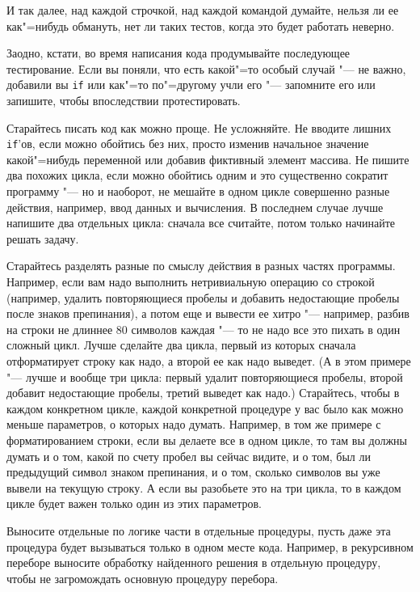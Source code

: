 \documentclass[a4paper,10pt]{problems}
\begin{document}
И так далее, над каждой строчкой, над каждой командой думайте, нельзя ли ее как"=нибудь обмануть, нет ли таких тестов, когда это будет работать неверно.

Заодно, кстати, во время написания кода продумывайте последующее тестирование. 
Если вы поняли, что есть какой"=то особый случай "--- не важно, добавили вы \verb'if' или как"=то по"=другому учли его "--- 
запомните его или запишите, чтобы впоследствии протестировать.

Старайтесь писать код как можно проще. Не усложняйте. 
Не вводите лишних \verb'if''ов, если можно обойтись без них, просто изменив начальное значение какой"=нибудь переменной или добавив фиктивный элемент массива.
Не пишите два похожих цикла, если можно обойтись одним и это существенно сократит программу "--- 
но и наоборот, не мешайте в одном цикле совершенно разные действия, например, ввод данных и вычисления. 
В последнем случае лучше напишите два отдельных цикла: сначала все считайте, потом только начинайте решать задачу.

Старайтесь разделять разные по смыслу действия в разных частях программы. 
Например, если вам надо выполнить нетривиальную операцию со строкой (например, удалить повторяющиеся пробелы и добавить недостающие пробелы после знаков препинания),
а потом еще и вывести ее хитро "--- например, разбив на строки не длиннее 80 символов каждая "--- то не надо все это пихать в один сложный цикл.
Лучше сделайте два цикла, первый из которых сначала отформатирует строку как надо, а второй ее как надо выведет.
(А в этом примере "--- лучше и вообще три цикла: первый удалит повторяющиеся пробелы, второй добавит недостающие пробелы, третий выведет как надо.)
Старайтесь, чтобы в каждом конкретном цикле, каждой конкретной процедуре у вас было как можно меньше параметров, о которых надо думать. 
Например, в том же примере с форматированием строки, если вы делаете все в одном цикле, то там вы должны думать и о том, какой по счету пробел вы сейчас видите,
и о том, был ли предыдущий символ знаком препинания, и о том, сколько символов вы уже вывели на текущую строку. 
А если вы разобьете это на три цикла, то в каждом цикле будет важен только один из этих параметров.

Выносите отдельные по логике части в отдельные процедуры, пусть даже эта процедура будет вызываться только в одном месте кода. 
Например, в рекурсивном переборе выносите обработку найденного решения в отдельную процедуру, чтобы не загромождать основную процедуру перебора.
\end{document}
